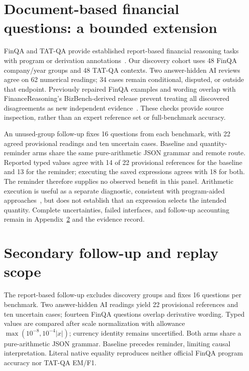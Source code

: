\section{Document-based financial questions: a bounded extension}\label{app:document-results}
FinQA and TAT-QA provide established report-based financial reasoning tasks with program or derivation annotations~\cite{finqa,tatqa}. Our discovery cohort uses 48 FinQA company/year groups and 48 TAT-QA contexts. Two answer-hidden AI reviews agree on 62 numerical readings; 34 cases remain conditional, disputed, or outside that endpoint. Previously repaired FinQA examples and wording overlap with FinanceReasoning's BizBench-derived release prevent treating all discovered disagreements as new independent evidence~\cite{financereasoning,bizbench}. These checks provide source inspection, rather than an expert reference set or full-benchmark accuracy.

An unused-group follow-up fixes 16 questions from each benchmark, with 22 agreed provisional readings and ten uncertain cases. Baseline and quantity-reminder arms share the same pure-arithmetic JSON grammar and remote route. Reported typed values agree with 14 of 22 provisional references for the baseline and 13 for the reminder; executing the saved expressions agrees with 18 for both. The reminder therefore supplies no observed benefit in this panel. Arithmetic execution is useful as a separate diagnostic, consistent with program-aided approaches~\cite{pot,pal}, but does not establish that an expression selects the intended quantity. Complete uncertainties, failed interfaces, and follow-up accounting remain in Appendix~\ref{app:quantity-transfer} and the evidence record.


\section{Secondary follow-up and replay scope}\label{app:quantity-transfer}
The report-based follow-up excludes discovery groups and fixes 16 questions per benchmark. Two answer-hidden AI readings yield 22 provisional references and ten uncertain cases; fourteen FinQA questions overlap derivative wording. Typed values are compared after scale normalization with allowance $\max(10^{-8},10^{-4}|x|)$; currency identity remains uncertified. Both arms share a pure-arithmetic JSON grammar. Baseline precedes reminder, limiting causal interpretation. Literal native equality reproduces neither official FinQA program accuracy nor TAT-QA EM/F1.

